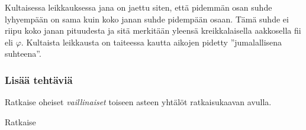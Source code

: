 \begin{tehtavasivu}
\begin{tehtava}
    Kultaisessa leikkauksessa jana on jaettu siten, että pidemmän osan suhde lyhyempään on sama kuin koko janan suhde pidempään osaan. Tämä suhde ei riipu koko janan pituudesta ja sitä merkitään yleensä kreikkalaisella aakkosella fii eli $\varphi$. Kultaista leikkausta on taiteessa kautta aikojen pidetty ''jumalallisena suhteena''. %
		\begin{alakohdat}
        \end{alakohdat}
    \begin{vastaus}
        \begin{alakohdat}
        \end{alakohdat}
    \end{vastaus}
\end{tehtava}

\subsubsection*{Lisää tehtäviä}

\begin{tehtava}
    Ratkaise oheiset \textit{vaillinaiset} toiseen asteen yhtälöt ratkaisukaavan avulla.
    \begin{alakohdat}
    \end{alakohdat}
    \begin{vastaus}
        \begin{alakohdat}       
        \end{alakohdat}
    \end{vastaus}
\end{tehtava}

\begin{tehtava}
    Ratkaise
    \begin{alakohdat}
    \end{alakohdat}
    \begin{vastaus}
        \begin{alakohdat}
        \end{alakohdat}
    \end{vastaus}
\end{tehtava}


\end{tehtavasivu}
